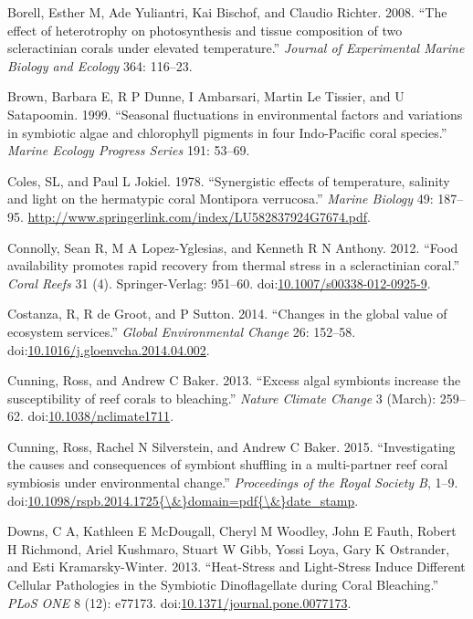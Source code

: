\documentclass[]{elsarticle} %
\begin{document}
\hypertarget{ref-Borell:2008p108}{}
Borell, Esther M, Ade Yuliantri, Kai Bischof, and Claudio Richter. 2008.
``The effect of heterotrophy on photosynthesis and tissue composition of
two scleractinian corals under elevated temperature.'' \emph{Journal of
Experimental Marine Biology and Ecology} 364: 116--23.

\hypertarget{ref-Brown:1999p3534}{}
Brown, Barbara E, R P Dunne, I Ambarsari, Martin Le Tissier, and U
Satapoomin. 1999. ``Seasonal fluctuations in environmental factors and
variations in symbiotic algae and chlorophyll pigments in four
Indo-Pacific coral species.'' \emph{Marine Ecology Progress Series} 191:
53--69.

\hypertarget{ref-Coles:1978p1124}{}
Coles, SL, and Paul L Jokiel. 1978. ``Synergistic effects of
temperature, salinity and light on the hermatypic coral Montipora
verrucosa.'' \emph{Marine Biology} 49: 187--95.
\url{http://www.springerlink.com/index/LU582837924G7674.pdf}.

\hypertarget{ref-Connolly:2012ep}{}
Connolly, Sean R, M A Lopez-Yglesias, and Kenneth R N Anthony. 2012.
``Food availability promotes rapid recovery from thermal stress in a
scleractinian coral.'' \emph{Coral Reefs} 31 (4). Springer-Verlag:
951--60.
doi:\href{https://doi.org/10.1007/s00338-012-0925-9}{10.1007/s00338-012-0925-9}.

\hypertarget{ref-Costanza:2014ex}{}
Costanza, R, R de Groot, and P Sutton. 2014. ``Changes in the global
value of ecosystem services.'' \emph{Global Environmental Change} 26:
152--58.
doi:\href{https://doi.org/10.1016/j.gloenvcha.2014.04.002}{10.1016/j.gloenvcha.2014.04.002}.

\hypertarget{ref-Cunning:2013gp}{}
Cunning, Ross, and Andrew C Baker. 2013. ``Excess algal symbionts
increase the susceptibility of reef corals to bleaching.'' \emph{Nature
Climate Change} 3 (March): 259--62.
doi:\href{https://doi.org/10.1038/nclimate1711}{10.1038/nclimate1711}.

\hypertarget{ref-Cunning:2015ja}{}
Cunning, Ross, Rachel N Silverstein, and Andrew C Baker. 2015.
``Investigating the causes and consequences of symbiont shuffling in a
multi-partner reef coral symbiosis under environmental change.''
\emph{Proceedings of the Royal Society B}, 1--9.
doi:\href{https://doi.org/10.1098/rspb.2014.1725\%7B/\&\%7Ddomain=pdf\%7B/\&\%7Ddate_stamp}{10.1098/rspb.2014.1725\{\textbackslash{}\&\}domain=pdf\{\textbackslash{}\&\}date\_stamp}.

\hypertarget{ref-Downs:2013kc}{}
Downs, C A, Kathleen E McDougall, Cheryl M Woodley, John E Fauth, Robert
H Richmond, Ariel Kushmaro, Stuart W Gibb, Yossi Loya, Gary K Ostrander,
and Esti Kramarsky-Winter. 2013. ``Heat-Stress and Light-Stress Induce
Different Cellular Pathologies in the Symbiotic Dinoflagellate during
Coral Bleaching.'' \emph{PLoS ONE} 8 (12): e77173.
doi:\href{https://doi.org/10.1371/journal.pone.0077173}{10.1371/journal.pone.0077173}.
\end{document}
